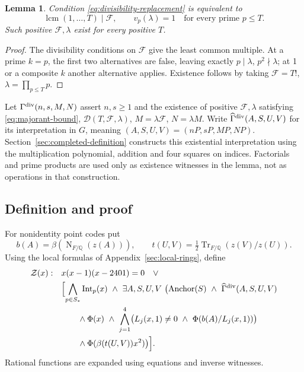 \documentclass[11pt]{article}
\newtheorem{lemma}[theorem]{Lemma}
\theoremstyle{definition}
\newcommand{\Q}{\mathbb Q}\newcommand{\Z}{\mathbb Z}
\newcommand{\Int}{\operatorname{Int}}
\newcommand{\Norm}{\operatorname{N}}
\newcommand{\Tr}{\operatorname{Tr}}
\begin{document}
\begin{lemma}\label{lem:divisibility-replacement}
Condition \eqref{eq:divisibility-replacement} is equivalent to
\[
 \operatorname{lcm}(1,\ldots,T)\mid \mathcal F,\qquad
 v_p(\lambda)=1\quad\text{for every prime }p\le T.
\]
Such positive \(\mathcal F,\lambda\) exist for every positive \(T\).
\end{lemma}
\begin{proof}
The divisibility conditions on \(\mathcal F\) give the least common multiple.
At a prime \(k=p\), the first two alternatives are false, leaving
exactly \(p\mid\lambda\), \(p^2\nmid\lambda\); at 1 or a
composite \(k\) another alternative applies. Existence follows by
taking \(\mathcal F=T!\), \(\lambda=\prod_{p\le T}p\).
\end{proof}

Let \(\Gamma^{\rm div}(n,s,M,N)\) assert \(n,s\ge1\) and
the existence of positive \(\mathcal F,\lambda\) satisfying
\eqref{eq:majorant-bound}, \(\mathcal D(T,\mathcal F,\lambda)\),
\(M=\lambda \mathcal F\), \(N=\lambda M\). Write
\(\widehat\Gamma^{\rm div}(A,S,U,V)\) for its interpretation
in \(G\), meaning \((A,S,U,V)=(nP,sP,MP,NP)\).
Section~\ref{sec:completed-definition} constructs this existential
interpretation using the multiplication polynomial, addition and four
squares on indices. Factorials and prime products are used only as
existence witnesses in the lemma, not as operations in that construction.

\subsection{Definition and proof}
For nonidentity point codes put
\[
 b(A)=\beta(\Norm_{F/\Q}(z(A))),\qquad
 t(U,V)=\tfrac12\Tr_{F/\Q}(z(V)/z(U)).
\]
Using the local formulas of Appendix~\ref{sec:local-rings}, define
\begin{equation}\label{eq:integer-formula}
\begin{split}
 \mathcal Z(x):\quad&x(x-1)(x-2401)=0\quad\vee\\
 &\Bigl[\bigwedge_{p\in S_*}\Int_p(x)\ \wedge\
 \exists A,S,U,V\ \bigl(\operatorname{Anchor}(S)\ \wedge\
 \widehat\Gamma^{\rm div}(A,S,U,V)\\
 &\qquad\wedge\Phi(x)\ \wedge\
 \bigwedge_{j=1}^4\bigl(L_j(x,1)\ne0\ \wedge\
       \Phi(b(A)/L_j(x,1))\bigr)\\
 &\qquad\wedge\Phi(\beta(t(U,V))x^2)\bigr)\Bigr].
\end{split}
\end{equation}
Rational functions are expanded using equations and inverse witnesses.
\end{document}
